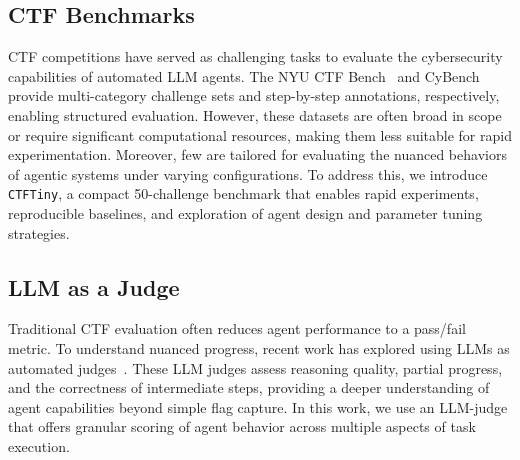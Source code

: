 \subsection{CTF Benchmarks} 
CTF competitions have served as challenging tasks to evaluate the cybersecurity capabilities of automated LLM agents. The NYU CTF Bench~\cite{shao2024nyu} and CyBench~\cite{zhang2024cybenchframeworkevaluatingcybersecurity} provide multi-category challenge sets and step-by-step annotations, respectively, enabling structured evaluation. However, these datasets are often broad in scope or require significant computational resources, making them less suitable for rapid experimentation. Moreover, few are tailored for evaluating the nuanced behaviors of agentic systems under varying configurations. To address this, we introduce \texttt{CTFTiny}, a compact  50-challenge benchmark that enables rapid experiments, reproducible baselines, and  exploration of agent design and parameter tuning strategies.

\subsection{LLM as a Judge}
Traditional CTF evaluation often reduces agent performance to a pass/fail metric. To understand nuanced progress, recent work has explored using LLMs as automated judges~\cite{gu2024survey,li2024llms,cao2025multi}. These LLM judges assess reasoning quality, partial progress, and the correctness of intermediate steps, providing a deeper understanding of agent capabilities beyond simple flag capture. In this work, we use an LLM-judge that offers granular scoring of agent behavior across multiple aspects of task execution.
